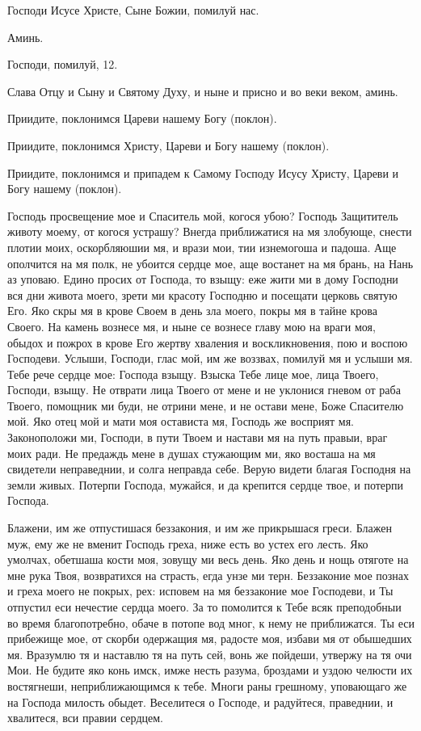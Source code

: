 Господи Исусе Христе, Сыне Божии, помилуй нас.

Аминь.

Господи, помилуй, 12.

Слава Отцу и Сыну и Святому Духу, и ныне и присно и во веки веком, аминь.

Приидите, поклонимся Цареви нашему Богу (поклон).

Приидите, поклонимся Христу, Цареви и Богу нашему (поклон).

Приидите, поклонимся и припадем к Самому Господу Исусу Христу, Цареви и Богу нашему (поклон).




Господь просвещение мое и Спаситель мой, когося убою? Господь Защититель животу моему, от когося устрашу? Внегда приближатися на мя злобующе, снести плотии моих, оскорбляюшии мя, и врази мои, тии изнемогоша и падоша. Аще ополчится на мя полк, не убоится сердце мое, аще востанет на мя брань, на Нань аз уповаю. Едино просих от Господа, то взыщу: еже жити ми в дому Господни вся дни живота моего, зрети ми красоту Господню и посещати церковь святую Его. Яко скры мя в крове Своем в день зла моего, покры мя в тайне крова Своего. На камень вознесе мя, и ныне се вознесе главу мою на враги моя, обыдох и пожрох в крове Его жертву хваления и воскликновения, пою и воспою Господеви. Услыши, Господи, глас мой, им же воззвах, помилуй мя и услыши мя. Тебе рече сердце мое: Господа взыщу. Взыска Тебе лице мое, лица Твоего, Господи, взыщу. Не отврати лица Твоего от мене и не уклонися гневом от раба Твоего, помощник ми буди, не отрини мене, и не остави мене, Боже Спасителю мой. Яко отец мой и мати моя остависта мя, Господь же восприят мя. Законоположи ми, Господи, в пути Твоем и настави мя на путь правыи,  враг моих ради. Не предаждь мене в душах стужающим ми, яко восташа на мя свидетели неправеднии, и солга неправда себе. Верую видети благая Господня на земли живых. Потерпи Господа, мужайся, и да крепится сердце твое, и потерпи Господа.




Блажени, им же отпустишася беззакония, и им же прикрышася греси. Блажен муж, ему же не вменит Господь греха, ниже есть во устех его лесть. Яко умолчах, обетшаша кости моя, зовущу ми весь день. Яко день и нощь отяготе на мне рука Твоя, возвратихся на страсть, егда унзе ми терн. Беззаконие мое познах и греха моего не покрых, рех: исповем на мя беззаконие мое Господеви, и Ты отпустил еси нечестие сердца моего. За то помолится к Тебе всяк преподобныи во время благопотребно, обаче в потопе вод мног, к нему не приближатся. Ты еси прибежище мое, от скорби одержащия мя, радосте моя, избави мя от обышедших мя. Вразумлю тя и наставлю тя на путь сей, вонь же пойдеши, утвержу на тя очи Мои. Не будите яко конь имск, имже несть разума, броздами и уздою челюсти их востягнеши, неприближающимся к тебе. Многи раны грешному, уповающаго же на Господа милость обыдет. Веселитеся о Господе, и радуйтеся, праведнии, и хвалитеся, вси правии сердцем.


